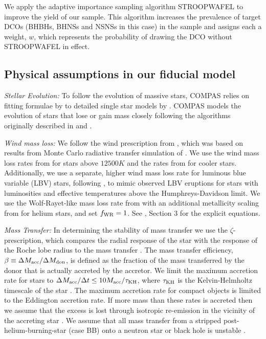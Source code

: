 We apply the adaptive importance sampling algorithm STROOPWAFEL \citep{Broekgaarden+2019} to improve the yield of our sample. This algorithm increases the prevalence of target DCOs (BHBHs, BHNSs and NSNSs in this case) in the sample and assigns each a weight, $w$, which represents the probability of drawing the DCO without STROOPWAFEL in effect.

\subsection{Physical assumptions in our fiducial model}\label{app:fiducial_physics}

\textit{Stellar Evolution:} To follow the evolution of massive stars, COMPAS relies on fitting formulae by \citet{Hurley+2000} to detailed single star models by \citet{Pols+1998}. COMPAS models the evolution of stars that lose or gain mass closely following the algorithms originally described in \citet{Tout+1996} and \citet{Hurley+2002}.

\textit{Wind mass loss:} We follow the wind prescription from \citet{Belczynski+2008}, which was based on results from Monte Carlo radiative transfer simulation of \citet{Vink+2000, Vink+2001}. We use the wind mass loss rates from \citet{Vink+2001} for stars above $12500 \unit{K}$ and the rates from \citet{Hurley+2000} for cooler stars. Additionally, we use a separate, higher wind mass loss rate for luminous blue variable (LBV) stars, following \citet{Belczynski+2008}, to mimic observed LBV eruptions for stars with luminosities and effective temperatures above the Humphreys-Davidson limit. We use the Wolf-Rayet-like mass loss rate from \citet{Hamann+1998} with an additional metallicity scaling from \citet{Vink+2005} for helium stars, and set $f_{\rm WR} = 1$. See \citet{COMPAS:2021methodsPaper}, Section 3 for the explicit equations.

\textit{Mass Transfer:} In determining the stability of mass transfer we use the $\zeta$-prescription, which compares the radial response of the star with the response of the Roche lobe radius to the mass transfer \citep[e.g.][]{Hjellming+1987}. The mass transfer efficiency, $\beta \equiv \Delta M_{\rm acc} / \Delta M_{\rm don}$, is defined as the fraction of the mass transferred by the donor that is actually accreted by the accretor. We limit the maximum accretion rate for stars to $\Delta M_{\rm acc} / \Delta t \le 10 M_{\rm acc} / \tau_{\rm KH}$, where $\tau_{\rm KH}$ is the Kelvin-Helmholtz timescale of the star \citep{Paczynski+1972, Hurley+2002}. The maximum accretion rate for compact objects is limited to the Eddington accretion rate. If more mass than these rates is accreted then we assume that the excess is lost through isotropic re-emission in the vicinity of the accreting star \citep[e.g.][]{Massevitch+1975, Soberman+1997}. We assume that all mass transfer from a stripped post-helium-burning-star (case BB) onto a neutron star or black hole is unstable \citep{Tauris+2015}.

